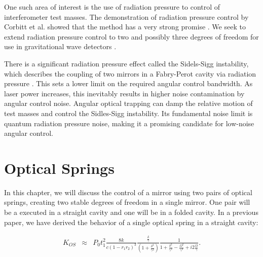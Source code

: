 One such area of interest is the use of radiation pressure to control of interferometer test masses.
The demonstration of radiation pressure control by Corbitt et al. showed that the method has a very strong promise \cite{Corbitt07}. 
We seek to extend radiation pressure control to two and possibly three degrees of freedom for use in gravitational wave detectors \cite{Punturo10}.

There is a significant radiation pressure effect called the Sidels-Sigg instability, which describes the coupling of two mirrors in a Fabry-Perot cavity via radiation pressure \cite{Sidles06}.
This sets a lower limit on the required angular control bandwidth. As laser power increases, this inevitably results in higher noise contamination by angular control noise.
Angular optical trapping can damp the relative motion of test masses and control the Sidles-Sigg instability. 
Its fundamental noise limit is quantum radiation pressure noise, making it a promising candidate for low-noise angular control.


\section{Optical Springs}
In this chapter, we will discuss the control of a mirror using two pairs of optical springs, creating two stable degrees of freedom in a single mirror. One pair will be a executed in a straight cavity and one will be in a folded cavity. In a previous paper, we have derived the behavior of a single optical spring in a straight cavity:

\begin{eqnarray}
\label{eq:KOSlong}
K_{OS} & {\approx} & P_0 t_1^2 \frac{8k}{c(1-r_1r_2)^3}\frac{ \frac{\delta}{\gamma}}{(1+\frac{\delta^2}{\gamma^2})} 
\frac{1}{1+\frac{\delta^2}{\gamma^2}-\frac{\Omega^2}{\gamma^2}+i2\frac{\Omega}{\gamma} }.
\end{eqnarray}

